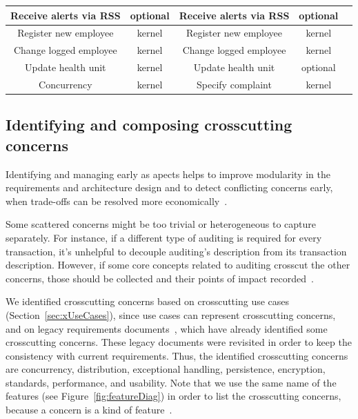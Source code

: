 \documentclass[11pt,twoside]{article}
\begin{document}
\begin{center}
\begin{footnotesize}
\begin{tabular}{c|c|c|c|c}
Receive alerts via RSS & optional & Receive alerts via RSS  & optional & \\ \hline
Register new employee& kernel & Register new employee & kernel & \\ \hline
Change logged employee & kernel & Change logged employee & kernel& \\ \hline
Update health unit& kernel & Update health unit & optional & \\ \hline
Concurrency & kernel & Specify complaint & kernel & \\ \hline
\end{tabular}
\end{footnotesize}
\end{center}


\subsection{Identifying and composing crosscutting concerns}
Identifying and managing early as apects helps to improve modularity in the requirements and architecture design and to detect
conflicting concerns early, when trade-offs can be resolved more economically~\cite{Baniassad:2006:DEA}.

Some scattered concerns might be too trivial or heterogeneous to capture separately. For instance, if a different type of auditing
is required for every transaction, it's unhelpful to decouple auditing's description from its transaction description. However, if some core
concepts related to auditing crosscut the other concerns, those should be collected and their points of impact
recorded~\cite{Baniassad:2006:DEA}.

We identified crosscutting concerns based on crosscutting use cases (Section~\ref{sec:xUseCases}), since use cases can represent
crosscutting concerns, and on legacy requirements documents~\cite{hw-usecase,hw-aore,hw-viewpoints-v2,hw-mdsoc,hw-alignment}, which have
already
identified some crosscutting concerns. These legacy documents were revisited in order to keep the consistency with current requirements.
Thus, the identified crosscutting concerns are concurrency, distribution, exceptional handling, persistence, encryption,
standards, performance, and usability. Note that we use the same name of the features (see Figure~\ref{fig:featureDiag}) in order to list
the crosscutting concerns, because a concern is a kind of feature~\cite{Cottenier:2007:MWA,Robillard:2007:RCS}.
\end{document}
